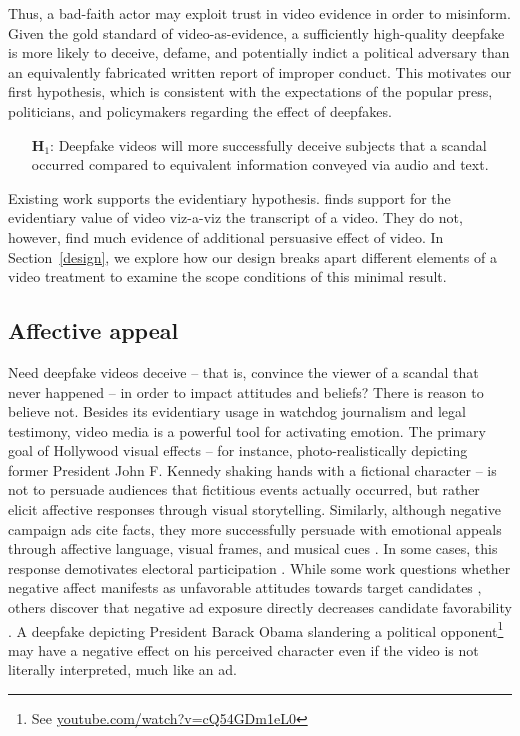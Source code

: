 \documentclass[12pt,letterpaper]{article}
\begin{document}
Thus, a bad-faith actor may exploit trust in video evidence in order to misinform. Given the gold standard of video-as-evidence, a sufficiently high-quality deepfake is more likely to deceive, defame, and potentially indict a political adversary than an equivalently fabricated written report of improper conduct. This motivates our first hypothesis, which is consistent with the expectations of the popular press, politicians, and policymakers regarding the effect of deepfakes.

\begin{itemize}
    \item[\textbf{H$_1$}:] Deepfake videos will more successfully deceive subjects that a scandal occurred compared to equivalent information conveyed via audio and text.
\end{itemize}

Existing work supports the evidentiary hypothesis. \cite{wittenberg2020minimal} finds support for the evidentiary value of video viz-a-viz the transcript of a video. They do not, however, find much evidence of additional persuasive effect of video. In Section~\ref{design}, we explore how our design breaks apart different elements of a video treatment to examine the scope conditions of this minimal result.





\subsection{Affective appeal}

Need deepfake videos deceive -- that is, convince the viewer of a scandal that never happened -- in order to impact attitudes and beliefs? There is reason to believe not. Besides its evidentiary usage in watchdog journalism and legal testimony, video media is a powerful tool for activating emotion. The primary goal of Hollywood visual effects -- for instance, photo-realistically depicting former President John F. Kennedy shaking hands with a fictional character -- is not to persuade audiences that fictitious events actually occurred, but rather elicit affective responses through visual storytelling. Similarly, although negative campaign ads cite facts, they more successfully persuade with emotional appeals through affective language, visual frames, and musical cues \citep{brader2006campaigning}. In some cases, this response demotivates electoral participation \citep{ansolabehere1997going}. While some work questions whether negative affect manifests as unfavorable attitudes towards target candidates \citep{lau1999effects, brader2006campaigning,lau2007effects}, others discover that negative ad exposure directly decreases candidate favorability \citep{fridkin2011variability, fridkin2004negative}. 
A deepfake depicting President Barack Obama slandering a political opponent\footnote{See \url{youtube.com/watch?v=cQ54GDm1eL0}} may have a negative effect on his perceived character even if the video is not literally interpreted, much like an ad.
\end{document}
